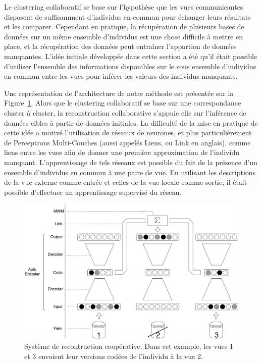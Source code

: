 Le clustering collaboratif se base sur l'hypothèse que les vues communicantes disposent de suffisamment d'individus en commun pour échanger leurs résultats et les comparer. Cependant en pratique, la récupération de plusieurs bases de données sur un m\^{e}me ensemble d'individus est une chose difficile à mettre en place, et la récupération des données peut entraîner l'appartion de données manquantes. L'idée initiale développée dans cette section a été qu'il était possible d'utiliser l'ensemble des informations disponibles sur le sous ensemble d'individus en commun entre les vues pour inférer les valeurs des individus manquants.

Une représentation de l'architecture de notre méthode est présentée sur la Figure~\ref{fig:sum_base}. Alors que le clustering collaboratif se base sur une correspondance cluster à cluster, la reconstruction collaborative s'appuie elle sur l'inférence de données cibles à partir de données initiales. La difficulté de la mise en pratique de cette idée a motivé l'utilisation de réseaux de neurones, et plus particulièrement de Perceptrons Multi-Couches (aussi appelés Liens, ou Link en anglais), comme liens entre les vues afin de donner une première approximation de l'individu manquant. L'apprentissage de tels réseaux est possible du fait de la présence d'un ensemble d'individus en commun à une paire de vue. En utilisant les descriptions de la vue externe comme entrée et celles de la vue locale comme sortie, il était possible d'effectuer un apprentissage supervisé du réseau.

	\begin{figure}[h]
		\centering
		\includegraphics[width=\textwidth]{img/base_system.pdf}
        \caption{Système de recontruction coopérative. Dans cet example, les vues 1 et 3 envoient leur versions codées de l'individu à la vue 2.}
\label{fig:sum_base}
	\end{figure}

